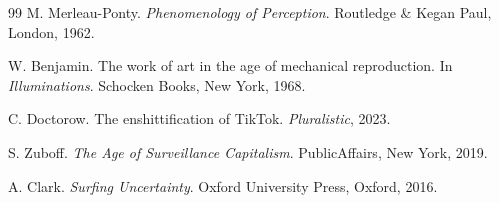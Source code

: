\documentclass[11pt]{article}
\begin{document}
\begin{thebibliography}{99}
M. Merleau-Ponty.
\newblock \emph{Phenomenology of Perception}.
\newblock Routledge \& Kegan Paul, London, 1962.

W. Benjamin.
\newblock The work of art in the age of mechanical reproduction.
\newblock In \emph{Illuminations}.
\newblock Schocken Books, New York, 1968.

C. Doctorow.
\newblock The enshittification of TikTok.
\newblock \emph{Pluralistic}, 2023.

S. Zuboff.
\newblock \emph{The Age of Surveillance Capitalism}.
\newblock PublicAffairs, New York, 2019.

A. Clark.
\newblock \emph{Surfing Uncertainty}.
\newblock Oxford University Press, Oxford, 2016.

\end{thebibliography}
\end{document}
